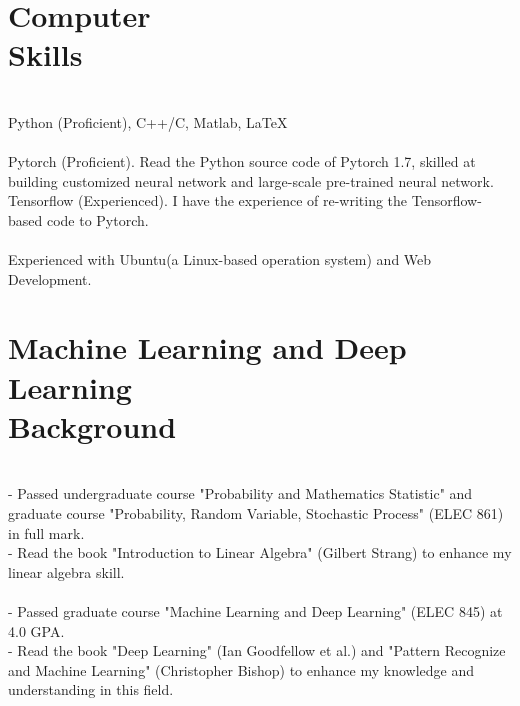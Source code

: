 \documentclass[mm]{simple_style}
\begin{document}
\begin{resume}
\begin{project}
{  }
\end{project}
\sectionline
\section{Computer\\Skills}
\\ Python (Proficient), C++/C, Matlab, \LaTeX\\
\newline
{}\\
{Pytorch (Proficient)}. Read the Python source code of Pytorch 1.7, skilled at building customized neural network and large-scale pre-trained neural network.\\
Tensorflow (Experienced). I have the experience of re-writing the Tensorflow-based code to Pytorch.
\\
\newline
{}\\
Experienced with Ubuntu(a Linux-based operation system) and Web Development.\\
\vspace{-2ex}
\sectionline
\section{Machine Learning and Deep Learning\\Background}
\\ 
- Passed undergraduate course "Probability and Mathematics Statistic" and graduate course "Probability, Random Variable, Stochastic Process" (ELEC 861) in full mark.\\
- Read the book "Introduction to Linear Algebra" (Gilbert Strang) to enhance my linear algebra skill.\\

\\
- Passed graduate course "Machine Learning and Deep Learning" (ELEC 845) at 4.0 GPA.\\
- Read the book "Deep Learning" (Ian Goodfellow et al.) and "Pattern Recognize and Machine Learning" (Christopher Bishop) to enhance my knowledge and understanding in this field.\\
\vspace{-2ex}
\sectionline

\end{resume}
\end{document}
